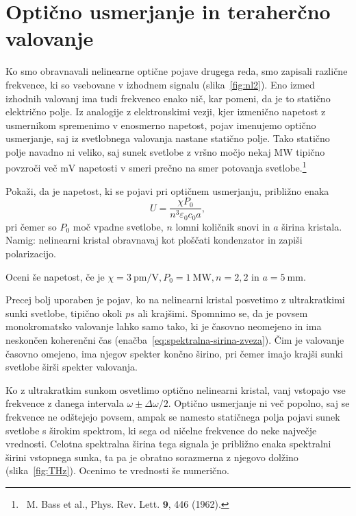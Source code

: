 \section{Optično usmerjanje in teraherčno valovanje}
Ko smo obravnavali nelinearne optične pojave drugega reda, smo zapisali
različne frekvence, ki so vsebovane v izhodnem signalu (slika~\ref{fig:nl2}). Eno izmed
izhodnih valovanj ima tudi frekvenco enako nič, kar pomeni, da je to statično električno polje. Iz analogije
z elektronskimi vezji, kjer izmenično napetost z usmernikom spremenimo v enosmerno napetost, 
pojav imenujemo optično usmerjanje, saj iz svetlobnega valovanja nastane statično polje. Tako statično 
polje navadno ni veliko, saj sunek svetlobe z vršno močjo nekaj $\si{\mega\watt}$ tipično povzroči 
več $\si{\milli\volt}$ napetosti v smeri prečno na smer potovanja svetlobe.\footnote{~M. Bass
et al., Phys. Rev. Lett. $\mathbf{9}$, 446 (1962).}

\begin{naloga}
Pokaži, da je napetost, ki se pojavi pri optičnem usmerjanju, približno enaka
\begin{equation}
U = \frac{\chi P_0}{n^3 \varepsilon_0 c_0 a},
\end{equation}
pri čemer so $P_0$ moč vpadne svetlobe, $n$ lomni količnik snovi in $a$ širina kristala.\\
Namig: nelinearni kristal obravnavaj kot ploščati kondenzator in zapiši polarizacijo.

Oceni še napetost, če je
$\chi = 3~\si{\pico\meter/\volt}, P_0 = 1~\si{\mega\watt}, n = 2,2$ in $a = 5~\si{\milli\metre}$. 
\end{naloga}

Precej bolj uporaben je pojav, ko na nelinearni kristal posvetimo z ultrakratkimi 
sunki svetlobe, tipično okoli $\si{ps}$ ali krajšimi. Spomnimo se, da je povsem 
monokromatsko valovanje lahko samo tako, ki je časovno neomejeno in ima neskončen koherenčni čas
(enačba~\ref{eq:spektralna-sirina-zveza}). 
Čim je valovanje časovno omejeno, ima njegov spekter končno širino, pri čemer 
imajo krajši sunki svetlobe širši spekter valovanja. 

Ko z ultrakratkim sunkom osvetlimo optično 
nelinearni kristal, vanj
vstopajo vse frekvence z danega intervala $\omega \pm \Delta \omega/2$.
Optično usmerjanje ni več popolno, saj se frekvence ne odštejejo povsem, ampak se 
namesto statičnega polja pojavi sunek svetlobe s širokim spektrom, ki sega od ničelne
frekvence do neke največje vrednosti. Celotna spektralna širina tega signala je 
približno enaka spektralni širini vstopnega sunka, ta pa je obratno sorazmerna z njegovo dolžino
(slika~\ref{fig:THz}).
Ocenimo te vrednosti še numerično. 

